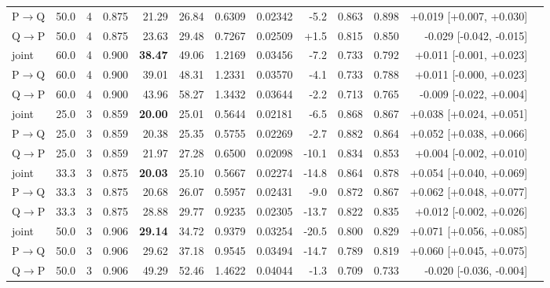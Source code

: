\documentclass{article}
\begin{document}
\begin{longtable}{llrrrrrrrrrrl}
P$\to$Q & 50.0 & 4 & 0.875 & 21.29 & 26.84 & 0.6309 & 0.02342 & -5.2 & 0.863 & 0.898 & +0.019 [+0.007, +0.030] \\
Q$\to$P & 50.0 & 4 & 0.875 & 23.63 & 29.48 & 0.7267 & 0.02509 & +1.5 & 0.815 & 0.850 & -0.029 [-0.042, -0.015] \\
joint & 60.0 & 4 & 0.900 & \textbf{38.47} & 49.06 & 1.2169 & 0.03456 & -7.2 & 0.733 & 0.792 & +0.011 [-0.001, +0.023] \\
P$\to$Q & 60.0 & 4 & 0.900 & 39.01 & 48.31 & 1.2331 & 0.03570 & -4.1 & 0.733 & 0.788 & +0.011 [-0.000, +0.023] \\
Q$\to$P & 60.0 & 4 & 0.900 & 43.96 & 58.27 & 1.3432 & 0.03644 & -2.2 & 0.713 & 0.765 & -0.009 [-0.022, +0.004] \\
joint & 25.0 & 3 & 0.859 & \textbf{20.00} & 25.01 & 0.5644 & 0.02181 & -6.5 & 0.868 & 0.867 & +0.038 [+0.024, +0.051] \\
P$\to$Q & 25.0 & 3 & 0.859 & 20.38 & 25.35 & 0.5755 & 0.02269 & -2.7 & 0.882 & 0.864 & +0.052 [+0.038, +0.066] \\
Q$\to$P & 25.0 & 3 & 0.859 & 21.97 & 27.28 & 0.6500 & 0.02098 & -10.1 & 0.834 & 0.853 & +0.004 [-0.002, +0.010] \\
joint & 33.3 & 3 & 0.875 & \textbf{20.03} & 25.10 & 0.5667 & 0.02274 & -14.8 & 0.864 & 0.878 & +0.054 [+0.040, +0.069] \\
P$\to$Q & 33.3 & 3 & 0.875 & 20.68 & 26.07 & 0.5957 & 0.02431 & -9.0 & 0.872 & 0.867 & +0.062 [+0.048, +0.077] \\
Q$\to$P & 33.3 & 3 & 0.875 & 28.88 & 29.77 & 0.9235 & 0.02305 & -13.7 & 0.822 & 0.835 & +0.012 [-0.002, +0.026] \\
joint & 50.0 & 3 & 0.906 & \textbf{29.14} & 34.72 & 0.9379 & 0.03254 & -20.5 & 0.800 & 0.829 & +0.071 [+0.056, +0.085] \\
P$\to$Q & 50.0 & 3 & 0.906 & 29.62 & 37.18 & 0.9545 & 0.03494 & -14.7 & 0.789 & 0.819 & +0.060 [+0.045, +0.075] \\
Q$\to$P & 50.0 & 3 & 0.906 & 49.29 & 52.46 & 1.4622 & 0.04044 & -1.3 & 0.709 & 0.733 & -0.020 [-0.036, -0.004] \\
\bottomrule\end{longtable}
\end{document}
